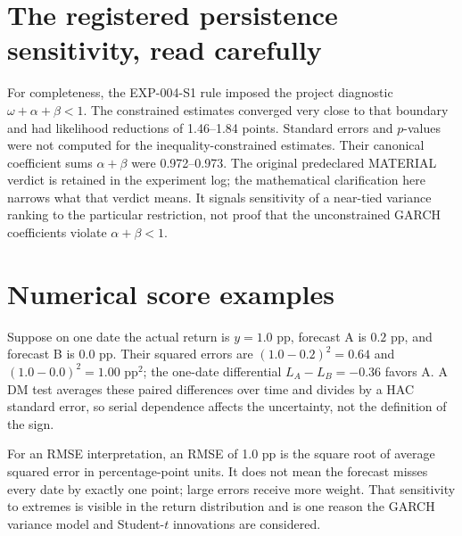 \documentclass[11pt,a4paper]{article}
\begin{document}
\section{The registered persistence sensitivity, read carefully}
For completeness, the EXP-004-S1 rule imposed the project diagnostic
$\omega+\alpha+\beta<1$. The constrained estimates converged very close to that boundary and
had likelihood reductions of 1.46--1.84 points. Standard errors and $p$-values were not computed
for the inequality-constrained estimates. Their canonical coefficient sums $\alpha+\beta$ were
0.972--0.973. The original predeclared MATERIAL verdict is retained in the experiment log; the
mathematical clarification here narrows what that verdict means. It signals sensitivity of a
near-tied variance ranking to the particular restriction, not proof that the unconstrained
GARCH coefficients violate $\alpha+\beta<1$.

\section{Numerical score examples}
Suppose on one date the actual return is $y=1.0$ pp, forecast A is $0.2$ pp, and forecast B is
$0.0$ pp. Their squared errors are $(1.0-0.2)^2=0.64$ and $(1.0-0.0)^2=1.00$ pp$^2$; the
one-date differential $L_A-L_B=-0.36$ favors A. A DM test averages these paired differences
over time and divides by a HAC standard error, so serial dependence affects the uncertainty,
not the definition of the sign.

For an RMSE interpretation, an RMSE of 1.0 pp is the square root of average squared error in
percentage-point units. It does not mean the forecast misses every date by exactly one point;
large errors receive more weight. That sensitivity to extremes is visible in the return
distribution and is one reason the GARCH variance model and Student-$t$ innovations are
considered.
\end{document}
